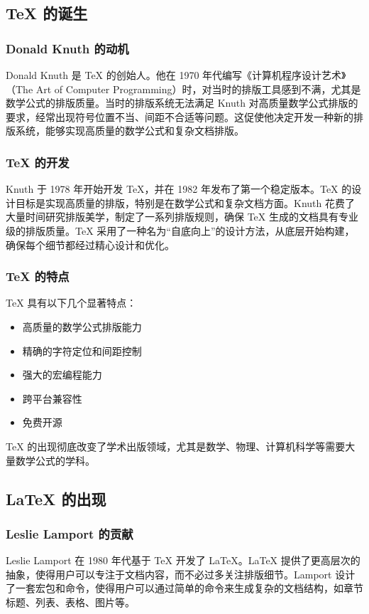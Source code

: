 \documentclass[UTF8,AutoFakeBold=1,AutoFakeSlant,zihao=-4]{SCAU}
\begin{document}
\subsection{TeX 的诞生}
\subsubsection{Donald Knuth 的动机}
Donald Knuth 是 TeX 的创始人。他在 1970 年代编写《计算机程序设计艺术》（The Art of Computer Programming）时，对当时的排版工具感到不满，尤其是数学公式的排版质量。当时的排版系统无法满足 Knuth 对高质量数学公式排版的要求，经常出现符号位置不当、间距不合适等问题。这促使他决定开发一种新的排版系统，能够实现高质量的数学公式和复杂文档排版。

\subsubsection{TeX 的开发}
Knuth 于 1978 年开始开发 TeX，并在 1982 年发布了第一个稳定版本。TeX 的设计目标是实现高质量的排版，特别是在数学公式和复杂文档方面。Knuth 花费了大量时间研究排版美学，制定了一系列排版规则，确保 TeX 生成的文档具有专业级的排版质量。TeX 采用了一种名为“自底向上”的设计方法，从底层开始构建，确保每个细节都经过精心设计和优化。

\subsubsection{TeX 的特点}
TeX 具有以下几个显著特点：
\begin{itemize}
    \item 高质量的数学公式排版能力
    \item 精确的字符定位和间距控制
    \item 强大的宏编程能力
    \item 跨平台兼容性
    \item 免费开源
\end{itemize}

TeX 的出现彻底改变了学术出版领域，尤其是数学、物理、计算机科学等需要大量数学公式的学科。

\subsection{LaTeX 的出现}
\subsubsection{Leslie Lamport 的贡献}
Leslie Lamport 在 1980 年代基于 TeX 开发了 LaTeX。LaTeX 提供了更高层次的抽象，使得用户可以专注于文档内容，而不必过多关注排版细节。Lamport 设计了一套宏包和命令，使得用户可以通过简单的命令来生成复杂的文档结构，如章节标题、列表、表格、图片等。
\end{document}
